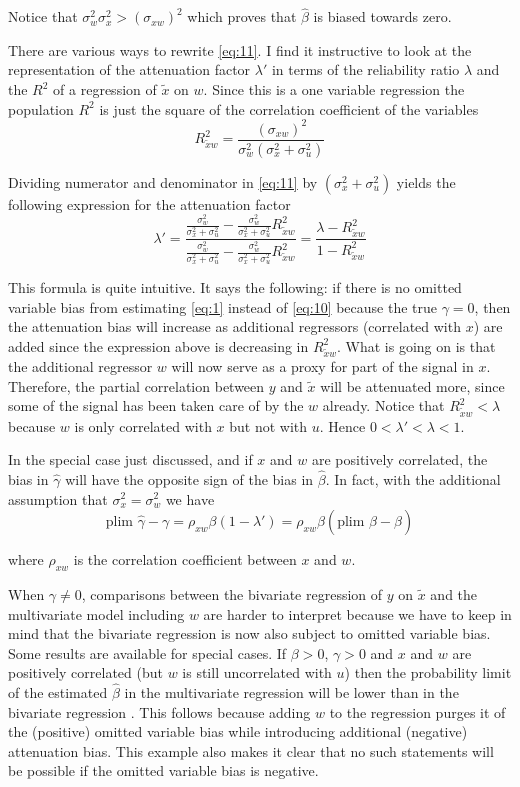 \documentclass[12pt]{article}
\begin{document}
Notice that $\sigma_w^2\sigma_x^2 > (\sigma_{xw})^2$ which proves that $\hat{\beta}$ is biased towards zero.

There are various ways to rewrite \eqref{eq:11}. I find it instructive to look at the representation of the attenuation factor $\lambda'$ in terms of the reliability ratio $\lambda$ and the $R^2$ of a regression of $\tilde{x}$ on $w$. Since this is a one variable regression the population $R^2$ is just the square of the correlation coefficient of the variables
\[
R_{\tilde{x}w}^2 = \frac{(\sigma_{xw})^2}{\sigma_w^2(\sigma_x^2 + \sigma_u^2)}
\]

Dividing numerator and denominator in \eqref{eq:11} by $(\sigma_x^2 + \sigma_u^2)$ yields the following expression for the attenuation factor
\[
\lambda' = \frac{\frac{\sigma_w^2}{\sigma_x^2 + \sigma_u^2} - \frac{\sigma_w^2}{\sigma_x^2 + \sigma_u^2}R_{\tilde{x}w}^2}{\frac{\sigma_w^2}{\sigma_x^2 + \sigma_u^2} - \frac{\sigma_w^2}{\sigma_x^2 + \sigma_u^2}R_{\tilde{x}w}^2} = \frac{\lambda - R_{\tilde{x}w}^2}{1 - R_{\tilde{x}w}^2}
\]

This formula is quite intuitive. It says the following: if there is no omitted variable bias from estimating \eqref{eq:1} instead of \eqref{eq:10} because the true $\gamma = 0$, then the attenuation bias will increase as additional regressors (correlated with $x$) are added since the expression above is decreasing in $R_{\tilde{x}w}^2$. What is going on is that the additional regressor $w$ will now serve as a proxy for part of the signal in $x$. Therefore, the partial correlation between $y$ and $\tilde{x}$ will be attenuated more, since some of the signal has been taken care of by the $w$ already. Notice that $R_{\tilde{x}w}^2 < \lambda$ because $w$ is only correlated with $x$ but not with $u$. Hence $0 < \lambda' < \lambda < 1$.

In the special case just discussed, and if $x$ and $w$ are positively correlated, the bias in $\hat{\gamma}$ will have the opposite sign of the bias in $\hat{\beta}$. In fact, with the additional assumption that $\sigma_x^2 = \sigma_w^2$ we have
\[
\text{plim } \hat{\gamma} - \gamma = \rho_{xw}\beta(1 - \lambda') = \rho_{xw}\beta(\text{plim } \hat{\beta} - \beta)
\]

where $\rho_{xw}$ is the correlation coefficient between $x$ and $w$.

When $\gamma \neq 0$, comparisons between the bivariate regression of $y$ on $\tilde{x}$ and the multivariate model including $w$ are harder to interpret because we have to keep in mind that the bivariate regression is now also subject to omitted variable bias. Some results are available for special cases. If $\beta > 0$, $\gamma > 0$ and $x$ and $w$ are positively correlated (but $w$ is still uncorrelated with $u$) then the probability limit of the estimated $\hat{\beta}$ in the multivariate regression will be lower than in the bivariate regression \cite{Maddala_1977}. This follows because adding $w$ to the regression purges it of the (positive) omitted variable bias while introducing additional (negative) attenuation bias. This example also makes it clear that no such statements will be possible if the omitted variable bias is negative.
\end{document}
